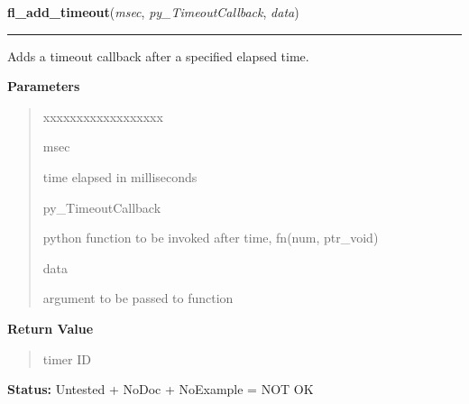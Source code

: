 \hspace{.8\funcindent}\begin{boxedminipage}{\funcwidth}

    \raggedright \textbf{fl\_add\_timeout}(\textit{msec}, \textit{py\_TimeoutCallback}, \textit{data})

    \vspace{-1.5ex}

    \rule{\textwidth}{0.5\fboxrule}
\setlength{\parskip}{2ex}
    Adds a timeout callback after a specified elapsed time.

\setlength{\parskip}{1ex}
      \textbf{Parameters}
      \vspace{-1ex}

      \begin{quote}
        \begin{Ventry}{xxxxxxxxxxxxxxxxxx}

          \item[msec]

          time elapsed in milliseconds

          \item[py\_TimeoutCallback]

          python function to be invoked after time, fn(num, ptr\_void)

          \item[data]

          argument to be passed to function

        \end{Ventry}

      \end{quote}

      \textbf{Return Value}
    \vspace{-1ex}

      \begin{quote}
      timer ID

      \end{quote}

\textbf{Status:} Untested + NoDoc + NoExample = NOT OK



    \end{boxedminipage}

    \label{xformslib:library:fl_remove_timeout}

    \vspace{0.5ex}

